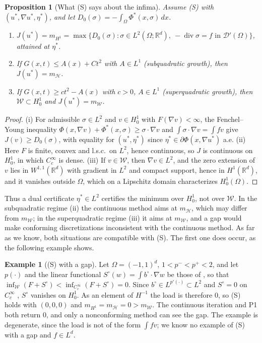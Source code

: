 \documentclass[11pt]{amsart}
\newtheorem{proposition}[theorem]{Proposition}
\theoremstyle{definition}
\newtheorem{example}[theorem]{Example}
\theoremstyle{remark}
\numberwithin{equation}{section}
\newcommand{\R}{\mathbb{R}}
\newcommand{\dx}{\,dx}
\newcommand{\Wc}{\mathcal W}
\newcommand{\mW}{m_{\mathcal W}}
\newcommand{\mH}{m_{\mathcal H}}
\newcommand{\mHone}{m_{H^1}}
\DeclareMathOperator{\divg}{div}
\begin{document}
\begin{proposition}[What (S) says about the infima]\label{prop:SvsGap}
Assume \textup{(S)} with $(u^*,\nabla u^*,\eta^*)$, and let $D_0(\sigma)=-\int_\Omega\Phi^*(x,\sigma)\dx$.
\begin{enumerate}[label=\textup{(\roman*)}]
\item $J(u^*)=\mHone=\max\{D_0(\sigma):\sigma\in L^2(\Omega;\R^d),\ -\divg\sigma=f\text{ in }\mathcal D'(\Omega)\}$, attained at $\eta^*$.
\item If $G(x,t)\le A(x)+Ct^2$ with $A\in L^1$ \textup(subquadratic growth\textup), then $J(u^*)=\mH$.
\item If $G(x,t)\ge ct^2-A(x)$ with $c>0$, $A\in L^1$ \textup(superquadratic growth\textup), then $\Wc\subset H^1_0$ and $J(u^*)=\mW$.
\end{enumerate}
\end{proposition}
\begin{proof}
(i) For admissible $\sigma\in L^2$ and $v\in H^1_0$ with $F(\nabla v)<\infty$, the Fenchel--Young inequality $\Phi(x,\nabla v)+\Phi^*(x,\sigma)\ge\sigma\cdot\nabla v$ and $\int\sigma\cdot\nabla v=\int fv$ give $J(v)\ge D_0(\sigma)$, with equality for $(u^*,\eta^*)$ since $\eta^*\in\partial\Phi(x,\nabla u^*)$ a.e. (ii) Here $F$ is finite, convex and l.s.c.\ on $L^2$, hence continuous, so $J$ is continuous on $H^1_0$, in which $C^\infty_c$ is dense. (iii) If $v\in\Wc$, then $\nabla v\in L^2$, and the zero extension of $v$ lies in $W^{1,1}(\R^d)$ with gradient in $L^2$ and compact support, hence in $H^1(\R^d)$, and it vanishes outside $\Omega$, which on a Lipschitz domain characterizes $H^1_0(\Omega)$.
\end{proof}
Thus a dual certificate $\eta^*\in L^2$ certifies the minimum over $H^1_0$, not over $\Wc$. In the subquadratic regime (ii) the continuous method aims at $\mH$, which may differ from $\mW$; in the superquadratic regime (iii) it aims at $\mW$, and a gap would make conforming discretizations inconsistent with the continuous method. As far as we know, both situations are compatible with (S). The first one does occur, as the following example shows.

\begin{example}[(S) with a gap]\label{ex:Sgap}
Let $\Omega=(-1,1)^d$, $1<p^-<p^+<2$, and let $p(\cdot)$ and the linear functional $S^\circ(w)=\int b^\circ\cdot\nabla w$ be those of \cite[Thm.~29]{BDS2020}, so that $\inf_{\Wc}(F+S^\circ)<\inf_{C^\infty_c}(F+S^\circ)=0$. Since $b^\circ\in L^{p'(\cdot)}\subset L^2$ and $S^\circ=0$ on $C^\infty_c$ \cite[Prop.~22]{BDS2020}, $S^\circ$ vanishes on $H^1_0$. As an element of $H^{-1}$ the load is therefore $0$, so (S) holds with $(0,0,0)$ and $\mHone=\mH=0>\mW$. The continuous iteration and P1 both return $0$, and only a nonconforming method can see the gap. The example is degenerate, since the load is not of the form $\int fv$; we know no example of (S) with a gap and $f\in L^d$.
\end{example}
\end{document}
